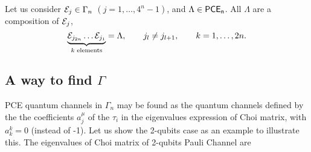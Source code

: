 Let us consider $\mathcal{E}_j\in\Gamma_n$ $(j=1,\ldots,4^{n}-1)$,
and $\Lambda\in\mathsf{PCE}_\mathsf{n}$. All $\Lambda$ are a composition of 
$\mathcal{E}_j$,
\begin{equation}\label{eq:PCE-characterization}
\underbrace{\mathcal{E}_{j_{2n}}\ldots\mathcal{E}_{j_1}}_{k\text{ elements}}=\Lambda,
\hspace{20pt}
j_l\neq j_{l+1},
\hspace{20pt}
k=1,\ldots,2n.
\end{equation}
\subsection*{A way to find $\Gamma$} %
PCE quantum channels in $\Gamma_n$ may be found as the quantum 
channels defined by the the coefficients $a_j^{\mu}$ of the $\tau_i$
in the eigenvalues expression of Choi matrix, with $a^{k}_{k}=0$ 
(instead of -1). Let us show the 2-qubits case as an example to illustrate this. 
The eigenvalues of Choi matrix of 2-qubits Pauli Channel are
